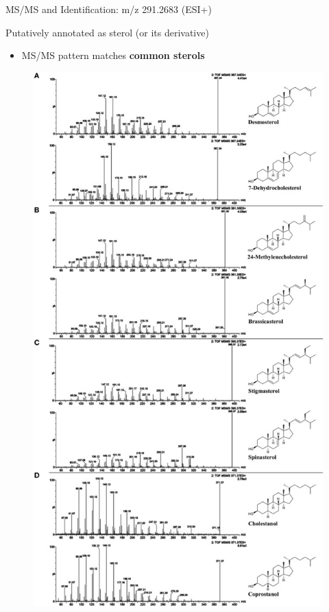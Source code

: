 \documentclass{beamer}
\begin{document}
\begin{frame}{MS/MS and Identification: m/z 291.2683 (ESI+)}
\begin{block} {Putatively annotated as sterol (or its derivative)}
\begin{itemize}
\item MS/MS pattern matches \textbf{common sterols}
\end{itemize}
\end{block}
\begin{figure}[H]
    \centering
    \includegraphics[scale=0.6]{images/sterolmsms.jpg}
    \label{fig:sterolmsms}
\end{figure}

\end{frame}
\end{document}
